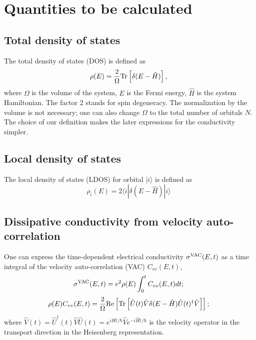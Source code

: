\documentclass[12pt,a4paper]{report}
\begin{document}
\section{Quantities to be calculated}

\subsection{Total density of states}
The total density of states (DOS) is defined as
\begin{equation}
\rho(E) = \frac{2}{\Omega}\textmd{Tr}\left[\delta(E-\hat{H})\right],
\end{equation}
where $\Omega$ is the volume of the system, $E$ is the Fermi energy, $\hat{H}$ is the system Hamiltonian. The factor 2 stands for spin degeneracy. The normalization by the volume is not necessary; one can also change $\Omega$ to the total number of orbitals $N$. The choice of our definition makes the later expressions for the conductivity simpler.

\subsection{Local density of states}
The local density of states (LDOS) for orbital $|i\rangle$ is defined as
\begin{equation}
\rho_i(E) = 2 \langle i| \delta(E-\hat{H}) |i\rangle
\end{equation}


\subsection{Dissipative conductivity from velocity auto-correlation}

One can express the time-dependent electrical conductivity $\sigma^{\rm VAC}(E, t)$
as a time integral of the velocity auto-correlation (VAC) $C_{vv}(E, t)$,
\begin{equation}
\label{equation:REC_VAC}
\sigma^{\rm VAC}(E, t) = e^2 \rho(E) \int_0^{t} C_{vv}(E,t) d t;
\end{equation}
\begin{equation}
\rho(E) C_{vv}(E, t) = \frac{2}{\Omega} \textmd{Re}
 \left[ \textmd{Tr} \left[\hat{U}(t) \hat{V} \delta(E - \hat{H}) \hat{U}(t)^{\dagger} \hat{V} \right] \right];
\end{equation}
where $\hat{V}(t) = \hat{U}^{\dagger}(t) \hat{V} \hat{U}(t) = e^{i\hat{H}t/\hbar} \hat{V} e^{-i\hat{H}t/\hbar}$
is the velocity operator in the transport direction in the Heisenberg representation. 
\end{document}
